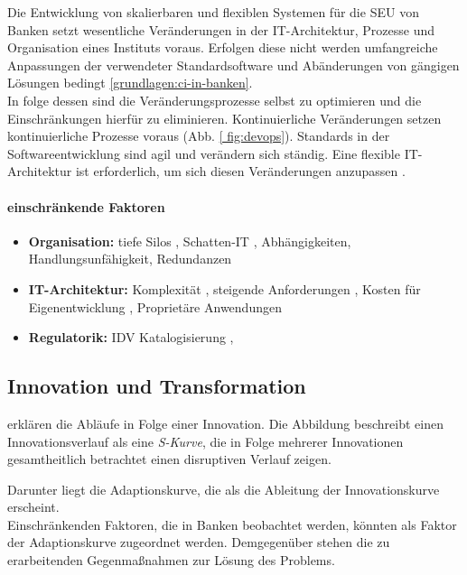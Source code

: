 Die Entwicklung von skalierbaren und flexiblen Systemen für die \ac{SEU} von Banken setzt wesentliche Veränderungen in der IT-Architektur, Prozesse und Organisation eines Instituts voraus. Erfolgen diese nicht werden umfangreiche Anpassungen der verwendeter Standardsoftware und Abänderungen von gängigen Lösungen bedingt \ref{grundlagen:ci-in-banken}.
\medskip
\\
In folge dessen sind die Veränderungsprozesse selbst zu optimieren und die Einschränkungen hierfür zu eliminieren. Kontinuierliche Veränderungen setzen kontinuierliche Prozesse voraus (Abb. \ref{ fig:devops}). Standards in der Softwareentwicklung sind agil und verändern sich ständig. Eine flexible IT-Architektur ist erforderlich, um sich diesen Veränderungen anzupassen \cite{Bussmann2006}.

\paragraph{einschränkende Faktoren}
\begin{itemize}
    \item \textbf{Organisation:} tiefe Silos \cite{Gupta:2017}, Schatten-IT \cite{recht/Bornemann2018}, Abhängigkeiten, Handlungsunfähigkeit, Redundanzen
    \item \textbf{IT-Architektur:} Komplexität \cite{Brockhoff2006}, steigende Anforderungen \cite{Brockhoff2006}, Kosten für Eigenentwicklung \cite{Gupta:2017}, Proprietäre Anwendungen \cite{Bussmann2006}
    \item \textbf{Regulatorik:} \ac{IDV} Katalogisierung
    \cite{recht/Bornemann2018}, 
    
\end{itemize}

\subsection{Innovation und Transformation}
\citet[Kap. 2.2]{Alt2017} erklären die Abläufe in Folge einer Innovation. Die Abbildung \cite[Abb. 2.1]{Alt2017} beschreibt einen Innovationsverlauf als eine \emph{S-Kurve}, die in Folge mehrerer Innovationen gesamtheitlich betrachtet einen disruptiven Verlauf zeigen.

Darunter liegt die Adaptionskurve, die als die Ableitung der Innovationskurve erscheint.
\medskip
\\
Einschränkenden Faktoren, die in Banken beobachtet werden, könnten als Faktor der Adaptionskurve \cite[Abb. 2.1]{Alt2017} zugeordnet werden. Demgegenüber stehen die zu erarbeitenden Gegenmaßnahmen zur Lösung des Problems. 

